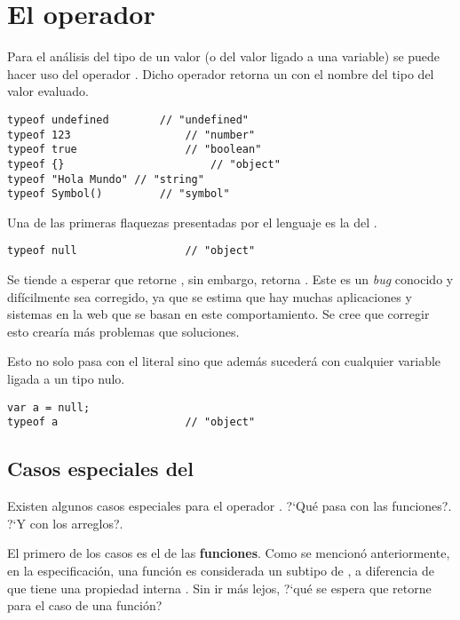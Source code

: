 \section{El operador }

Para el análisis del tipo de un valor (o del valor ligado a una variable) se puede hacer uso del operador . Dicho operador retorna un  con el nombre del tipo del valor evaluado.

\begin{lstlisting}[title={Analizando los tipos con \code{typeof}}]
typeof undefined		// "undefined"
typeof 123					// "number"
typeof true					// "boolean"
typeof {}						// "object"
typeof "Hola Mundo" // "string"
typeof Symbol()			// "symbol"
\end{lstlisting}

Una de las primeras flaquezas presentadas por el lenguaje es la del . 

\begin{lstlisting}[title={Analizando \code{typeof null}}]
typeof null					// "object"
\end{lstlisting}

Se tiende a esperar que  retorne , sin embargo, retorna . Este es un \textit{bug} conocido y difícilmente sea corregido, ya que se estima que hay muchas aplicaciones y sistemas en la web que se basan en este comportamiento. Se cree que corregir esto crearía más problemas que soluciones.

Esto no solo pasa con el literal  sino que además sucederá con cualquier variable ligada a un tipo nulo.

\begin{lstlisting}[title={Analizando \code{typeof null} (cont.)}]
var a = null;
typeof a					// "object"
\end{lstlisting}

\subsection{Casos especiales del }

Existen algunos casos especiales para el operador . ?`Qué pasa con las funciones?. ?`Y con los arreglos?. 

El primero de los casos es el de las \textbf{funciones}. Como se mencionó anteriormente, en la especificación, una función es considerada un subtipo de , a diferencia de que tiene una propiedad interna \code{[[Call]]}. Sin ir más lejos, ?`qué se espera que retorne  para el caso de una función?

